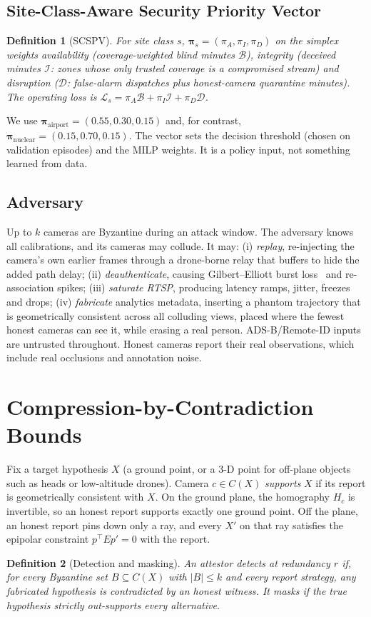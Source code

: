 \documentclass[journal]{IEEEtran}
\newtheorem{definition}{Definition}
\theoremstyle{remark}
\begin{document}
\subsection{Site-Class-Aware Security Priority Vector}
\begin{definition}[SCSPV]
For site class $s$, $\boldsymbol{\pi}_s=(\pi_A,\pi_I,\pi_D)$ on the simplex weights availability (coverage-weighted
blind minutes $\mathcal{B}$), integrity (deceived minutes $\mathcal{I}$: zones whose only trusted coverage is a
compromised stream) and disruption ($\mathcal{D}$: false-alarm dispatches plus honest-camera quarantine minutes). The
operating loss is $\mathcal{L}_s=\pi_A\mathcal{B}+\pi_I\mathcal{I}+\pi_D\mathcal{D}$.
\end{definition}
We use $\boldsymbol{\pi}_{\text{airport}}=(0.55,0.30,0.15)$ and, for contrast, $\boldsymbol{\pi}_{\text{nuclear}}=(0.15,0.70,0.15)$.
The vector sets the decision threshold (chosen on validation episodes) and the MILP weights. It is a policy input, not
something learned from data.

\subsection{Adversary}
Up to $k$ cameras are Byzantine during an attack window. The adversary knows all calibrations, and its cameras may
collude. It may: (i) \emph{replay}, re-injecting the camera's own earlier frames through a drone-borne relay that
buffers to hide the added path delay; (ii) \emph{deauthenticate}, causing Gilbert--Elliott burst loss~\cite{gilbert1960capacity}
and re-association spikes; (iii) \emph{saturate RTSP}, producing latency ramps, jitter, freezes and drops; (iv)
\emph{fabricate} analytics metadata, inserting a phantom trajectory that is geometrically consistent across all
colluding views, placed where the fewest honest cameras can see it, while erasing a real person. ADS-B/Remote-ID
inputs are untrusted throughout. Honest cameras report their real observations, which include real occlusions and
annotation noise.

\section{Compression-by-Contradiction Bounds}\label{sec:theory}
Fix a target hypothesis $X$ (a ground point, or a 3-D point for off-plane objects such as heads or low-altitude drones).
Camera $c\in C(X)$ \emph{supports} $X$ if its report is geometrically consistent with $X$. On the ground plane, the
homography $H_c$ is invertible, so an honest report supports exactly one ground point. Off the plane, an honest report
pins down only a ray, and every $X'$ on that ray satisfies the epipolar constraint $p^\top E p'=0$ with the report.
\begin{definition}[Detection and masking]
An attestor \emph{detects} at redundancy $r$ if, for every Byzantine set $B\subseteq C(X)$ with $|B|\le k$ and every
report strategy, any fabricated hypothesis is contradicted by an honest witness. It \emph{masks} if the true hypothesis
strictly out-supports every alternative.
\end{definition}
\end{document}

